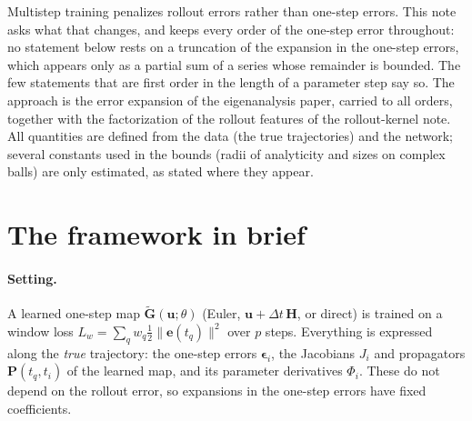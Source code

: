 \documentclass[11pt]{article}
\theoremstyle{definition}
\theoremstyle{remark}
\newcommand{\uu}{\mathbf{u}}
\newcommand{\ee}{\mathbf{e}}
\newcommand{\Gt}{\tilde{\mathbf{G}}}
\newcommand{\Hop}{\mathbf{H}}
\newcommand{\eps}{\bm{\epsilon}}
\newcommand{\dt}{\Delta t}
\newcommand{\Pp}{\mathbf P}
\begin{document}
Multistep training penalizes rollout errors rather than one-step errors.
This note asks what that changes, and keeps every order of the one-step error throughout: no statement below rests on a truncation of the expansion in the one-step errors, which appears only as a partial sum of a series whose remainder is bounded.
The few statements that are first order in the length of a parameter step say so.
The approach is the error expansion of the eigenanalysis paper, carried to all orders, together with the factorization of the rollout features of the rollout-kernel note.
All quantities are defined from the data (the true trajectories) and the network; several constants used in the bounds (radii of analyticity and sizes on complex balls) are only estimated, as stated where they appear.

\section{The framework in brief}\label{sec:framework}

\paragraph{Setting.}
A learned one-step map $\Gt(\uu;\theta)$ (Euler, $\uu+\dt\,\Hop$, or direct) is trained on a window loss $L_w=\sum_q w_q\tfrac12\|\ee(t_q)\|^2$ over $p$ steps.
Everything is expressed along the \emph{true} trajectory: the one-step errors $\eps_i$, the Jacobians $J_i$ and propagators $\Pp(t_q,t_i)$ of the learned map, and its parameter derivatives $\Phi_i$.
These do not depend on the rollout error, so expansions in the one-step errors have fixed coefficients.
\end{document}
